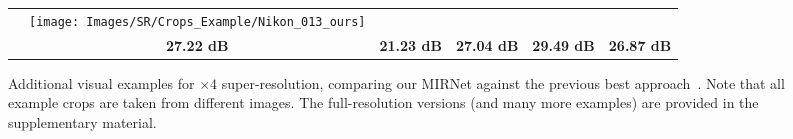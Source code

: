 \documentclass[runningheads]{llncs}
\begin{document}
\begin{figure}[t]
\begin{center}
{\begin{tabular}[b]{c@{ } c@{ }  c@{ } c@{ } c@{ } c@{ } }
    &  \texttt{[image: Images/SR/Crops\_Example/Nikon\_013\_ours]}
    \vspace{0.3mm}
    \\
& \textbf{27.22 dB} & \textbf{21.23 dB} & \textbf{27.04 dB} & \textbf{29.49 dB} & \textbf{26.87 dB}
\end{tabular}}
\end{center}
\vspace{-6mm}
\caption{\small Additional visual examples for $\times4$ super-resolution, comparing our MIRNet against the previous best approach~\cite{RealSR}. Note that all example crops are taken from different images. The full-resolution versions (and many more examples) are provided in the supplementary material. }
\label{fig:sr crop examples}
\vspace{-1.5em}
\end{figure}



\begin{table}[t]
\begin{center}
\caption{\small Cross-camera generalization test for super-resolution. Networks trained for one camera are tested on the other camera. Our MIRNet shows good generalization for all possible cases.}
\label{table:realSR generalization}
\setlength{\tabcolsep}{8.5pt}
\end{center}
\vspace{-2.6em}
\end{table}
\end{document}
